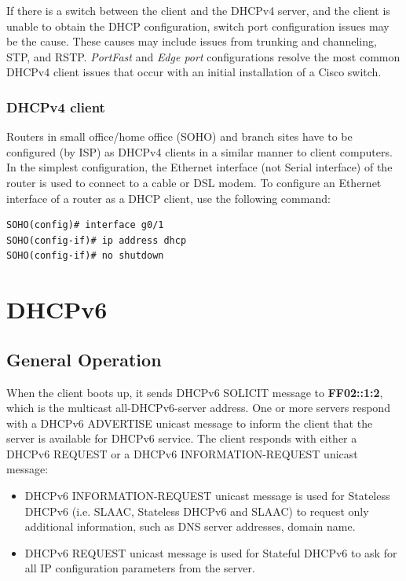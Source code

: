 \note  If there is a switch between the client and the DHCPv4 server, and the client is unable to obtain the DHCP configuration, switch port configuration issues may be the cause. These causes may include issues from trunking and channeling, STP, and RSTP. \emph{PortFast} and \emph{Edge port} configurations resolve the most common DHCPv4 client issues that occur with an initial installation of a Cisco switch.

\subsection{DHCPv4 client}

Routers in small office/home office (SOHO) and branch sites have to be configured (by ISP) as DHCPv4 clients in a similar manner to client computers. In the simplest configuration, the Ethernet interface (not Serial interface) of the router is used to connect to a cable or DSL modem. To configure an Ethernet interface of a router as a DHCP client, use the following command:

\begin{verbatim}
SOHO(config)# interface g0/1
SOHO(config-if)# ip address dhcp
SOHO(config-if)# no shutdown
\end{verbatim}


\chapter{DHCPv6}

\section{General Operation}

When the client boots up, it sends DHCPv6 SOLICIT message to \textbf{FF02::1:2}, which is the multicast all-DHCPv6-server address. One or more servers respond with a DHCPv6 ADVERTISE unicast message to inform the client that the server is available for DHCPv6 service. The client responds with either a DHCPv6 REQUEST or a DHCPv6 INFORMATION-REQUEST unicast message: 

\begin{itemize}
\item DHCPv6 INFORMATION-REQUEST unicast message is used for Stateless DHCPv6 (i.e. SLAAC, Stateless DHCPv6 and SLAAC) to request only additional information, such as DNS server addresses, domain name.
\item DHCPv6 REQUEST unicast message is used for Stateful DHCPv6 to ask for all IP configuration parameters from the server.
\end{itemize}

